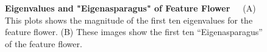 \begin{figure}
    \centering
    \qquad
    \caption[First ten eigenvalues and "Eigenasparagus" of Feature Flower]{\textbf{Eigenvalues and "Eigenasparagus" of Feature Flower}~~~(A) This plots shows the magnitude of the first ten eigenvalues for the feature flower. (B) These images show the first ten “Eigenasparagus” of the feature flower.}
    \label{fig:PCAflower}
\end{figure}

